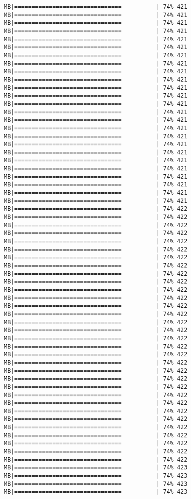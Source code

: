 \documentclass[
]{article}
\begin{document}
\begin{verbatim}
MB|===============================          | 74% 421 MB|===============================          | 74% 421 MB|===============================          | 74% 421 MB|===============================          | 74% 421 MB|===============================          | 74% 421 MB|===============================          | 74% 421 MB|===============================          | 74% 421 MB|===============================          | 74% 421 MB|===============================          | 74% 421 MB|===============================          | 74% 421 MB|===============================          | 74% 421 MB|===============================          | 74% 421 MB|===============================          | 74% 421 MB|===============================          | 74% 421 MB|===============================          | 74% 421 MB|===============================          | 74% 421 MB|===============================          | 74% 421 MB|===============================          | 74% 421 MB|===============================          | 74% 421 MB|===============================          | 74% 421 MB|===============================          | 74% 421 MB|===============================          | 74% 421 MB|===============================          | 74% 421 MB|===============================          | 74% 421 MB|===============================          | 74% 421 MB|===============================          | 74% 422 MB|===============================          | 74% 422 MB|===============================          | 74% 422 MB|===============================          | 74% 422 MB|===============================          | 74% 422 MB|===============================          | 74% 422 MB|===============================          | 74% 422 MB|===============================          | 74% 422 MB|===============================          | 74% 422 MB|===============================          | 74% 422 MB|===============================          | 74% 422 MB|===============================          | 74% 422 MB|===============================          | 74% 422 MB|===============================          | 74% 422 MB|===============================          | 74% 422 MB|===============================          | 74% 422 MB|===============================          | 74% 422 MB|===============================          | 74% 422 MB|===============================          | 74% 422 MB|===============================          | 74% 422 MB|===============================          | 74% 422 MB|===============================          | 74% 422 MB|===============================          | 74% 422 MB|===============================          | 74% 422 MB|===============================          | 74% 422 MB|===============================          | 74% 422 MB|===============================          | 74% 422 MB|===============================          | 74% 422 MB|===============================          | 74% 422 MB|===============================          | 74% 422 MB|===============================          | 74% 422 MB|===============================          | 74% 422 MB|===============================          | 74% 423 MB|===============================          | 74% 423 MB|===============================          | 74% 423 MB|===============================          | 74% 423 
\end{verbatim}
\end{document}
